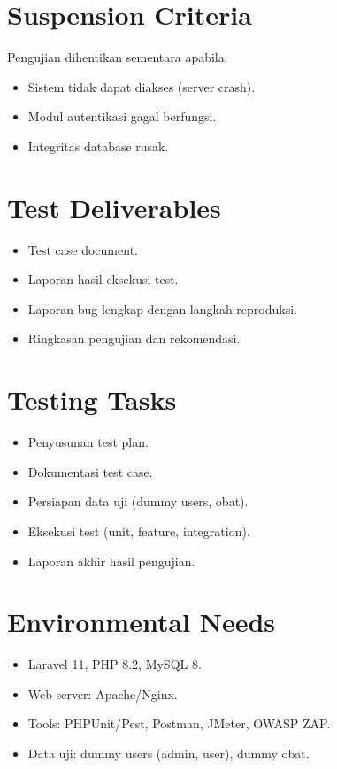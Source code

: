 \documentclass[12pt,a4paper]{article}
\begin{document}
\section{Suspension Criteria}
Pengujian dihentikan sementara apabila:
\begin{itemize}
    \item Sistem tidak dapat diakses (server crash).
    \item Modul autentikasi gagal berfungsi.
    \item Integritas database rusak.
\end{itemize}

\section{Test Deliverables}
\begin{itemize}
    \item Test case document.
    \item Laporan hasil eksekusi test.
    \item Laporan bug lengkap dengan langkah reproduksi.
    \item Ringkasan pengujian dan rekomendasi.
\end{itemize}

\section{Testing Tasks}
\begin{itemize}
    \item Penyusunan test plan.
    \item Dokumentasi test case.
    \item Persiapan data uji (dummy users, obat).
    \item Eksekusi test (unit, feature, integration).
    \item Laporan akhir hasil pengujian.
\end{itemize}

\section{Environmental Needs}
\begin{itemize}
    \item Laravel 11, PHP 8.2, MySQL 8.
    \item Web server: Apache/Nginx.
    \item Tools: PHPUnit/Pest, Postman, JMeter, OWASP ZAP.
    \item Data uji: dummy users (admin, user), dummy obat.
\end{itemize}
\end{document}

